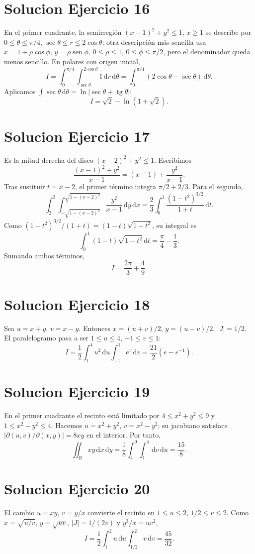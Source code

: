 \documentclass[11pt,a4paper]{article}
\DeclareMathOperator{\sen}{sen}
\DeclareMathOperator{\tg}{tg}
\newcommand{\dd}{\,\mathrm{d}}
\begin{document}
\section{Solucion Ejercicio 16}
En el primer cuadrante, la semirregión $(x-1)^2+y^2\le1$, $x\ge1$ se describe por $0\le\theta\le\pi/4$, $\sec\theta\le r\le2\cos\theta$; otra descripción más sencilla usa $x=1+\rho\cos\phi$, $y=\rho\sen\phi$, $0\le\rho\le1$, $0\le\phi\le\pi/2$, pero el denominador queda menos sencillo. En polares con origen inicial,
\[I=\int_0^{\pi/4}\int_{\sec\theta}^{2\cos\theta}1\dd r\dd\theta=\int_0^{\pi/4}(2\cos\theta-\sec\theta)\dd\theta.\]
Aplicamos $\int\sec\theta\dd\theta=\ln|\sec\theta+\tg\theta|$:
\[\boxed{I=\sqrt2-\ln(1+\sqrt2)}.\]

\section{Solucion Ejercicio 17}
Es la mitad derecha del disco $(x-2)^2+y^2\le1$. Escribimos
\[\frac{(x-1)^2+y^2}{x-1}=(x-1)+\frac{y^2}{x-1}.\]
Tras sustituir $t=x-2$, el primer término integra $\pi/2+2/3$. Para el segundo,
\[\int_2^3\int_{-\sqrt{1-(x-2)^2}}^{\sqrt{1-(x-2)^2}}\frac{y^2}{x-1}\dd y\dd x
=\frac23\int_0^1\frac{(1-t^2)^{3/2}}{1+t}\dd t.\]
Como $(1-t^2)^{3/2}/(1+t)=(1-t)\sqrt{1-t^2}$, su integral es
\[\int_0^1(1-t)\sqrt{1-t^2}\dd t=\frac\pi4-\frac13.\]
Sumando ambos términos,
\[\boxed{I=\frac{2\pi}{3}+\frac49}.\]

\section{Solucion Ejercicio 18}
Sea $u=x+y$, $v=x-y$. Entonces $x=(u+v)/2$, $y=(u-v)/2$, $|J|=1/2$. El paralelogramo pasa a ser $1\le u\le4$, $-1\le v\le1$:
\[I=\frac12\int_1^4u^2\dd u\int_{-1}^{1}e^v\dd v=\boxed{\frac{21}{2}(e-e^{-1})}.\]

\section{Solucion Ejercicio 19}
En el primer cuadrante el recinto está limitado por $4\le x^2+y^2\le9$ y $1\le x^2-y^2\le4$. Hacemos $u=x^2+y^2$, $v=x^2-y^2$; su jacobiano satisface $|\partial(u,v)/\partial(x,y)|=8xy$ en el interior. Por tanto,
\[\iint_R xy\dd x\dd y=\frac18\int_4^9\int_1^4\dd v\dd u=\boxed{\frac{15}{8}}.\]

\section{Solucion Ejercicio 20}
El cambio $u=xy$, $v=y/x$ convierte el recinto en $1\le u\le2$, $1/2\le v\le2$. Como $x=\sqrt{u/v}$, $y=\sqrt{uv}$, $|J|=1/(2v)$ y $y^3/x=uv^2$,
\[I=\frac12\int_1^2u\dd u\int_{1/2}^2v\dd v=\boxed{\frac{45}{32}}.\]
\end{document}
